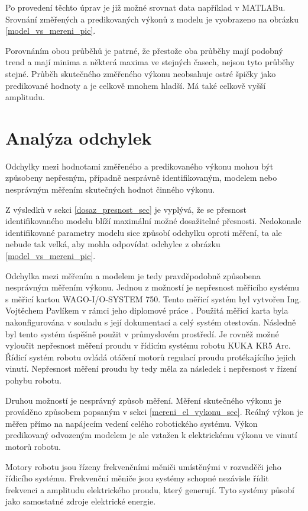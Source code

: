 Po provedení těchto úprav je již možné srovnat data například v MATLABu. Srovnání změřených a predikovaných výkonů z modelu je vyobrazeno na obrázku \ref{model_vs_mereni_pic}.

Porovnáním obou průběhů je patrné, že přestože oba průběhy mají podobný trend a mají minima a některá maxima ve stejných časech, nejsou tyto průběhy stejné. Průběh skutečného změřeného výkonu neobsahuje ostré špičky jako predikované hodnoty a je celkově mnohem hladší. Má také celkově vyšší amplitudu.  

\section{Analýza odchylek}
\label{analyza_odchylek_sec}

Odchylky mezi hodnotami změřeného a predikovaného výkonu mohou být způsobeny nepřesným, případně nesprávně identifikovaným, modelem nebo nesprávným měřením skutečných hodnot činného výkonu.

Z výsledků v sekci \ref{dosaz_presnost_sec} je vyplývá, že se přesnost identifikovaného modelu blíží maximální možné dosažitelné přesnosti. Nedokonale identifikované parametry modelu sice způsobí odchylku oproti měření, ta ale nebude tak velká, aby mohla odpovídat odchylce z obrázku \ref{model_vs_mereni_pic}.

Odchylka mezi měřením a modelem je tedy pravděpodobně způsobena nesprávným měřením výkonu. Jednou z možností je nepřesnost měřicího systému s měřicí kartou WAGO-I/O-SYSTEM 750. Tento měřicí systém byl vytvořen Ing. Vojtěchem Pavlíkem v rámci jeho diplomové práce \cite{vojtech_pavlik}. Použitá měřicí karta byla nakonfigurována v souladu s její dokumentací a celý systém otestován. Následně byl tento systém úspěšně použit v průmyslovém prostředí. Je rovněž možné vyloučit nepřesnost měření proudu v řídicím systému robotu KUKA KR5 Arc. Řídicí systém robotu ovládá otáčení motorů regulací proudu protékajícího jejich vinutí. Nepřesnost měření proudu by tedy měla za následek i nepřesnost v řízení pohybu robotu. 

Druhou možností je nesprávný způsob měření. Měření skutečného výkonu je prováděno způsobem popsaným v sekci \ref{mereni_el_vykonu_sec}. Reálný výkon je měřen přímo na napájecím vedení celého robotického systému. Výkon predikovaný odvozeným modelem je ale vztažen k elektrickému výkonu ve vinutí motorů robotu. 

Motory robotu jsou řízeny frekvenčními měniči umístěnými v rozvaděči jeho řídicího systému. Frekvenční měniče jsou systémy schopné nezávisle řídit frekvenci a amplitudu elektrického proudu, který generují. Tyto systémy působí jako samostatné zdroje elektrické energie. 

